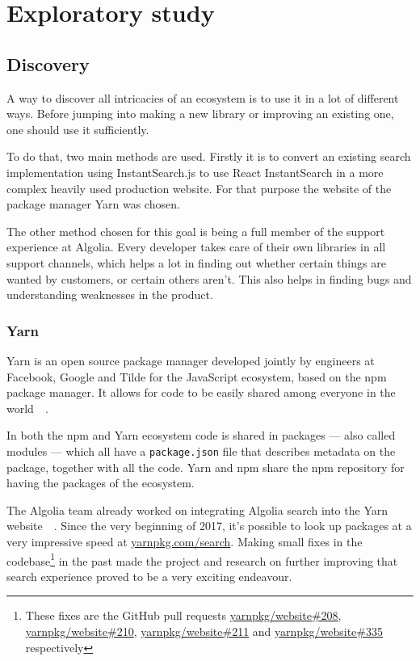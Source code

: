 
\chapter{Exploratory study} %
\label{chp:exploratory_study}

\section{Discovery}
\label{sec:discovery}

A way to discover all intricacies of an ecosystem is to use it in a lot of different ways. Before jumping into making a new library or improving an existing one, one should use it sufficiently.

To do that, two main methods are used. Firstly it is to convert an existing search implementation using InstantSearch.js\cite{instantsearch-js} to use React InstantSearch in a more complex heavily used production website. For that purpose the website of the package manager Yarn\cite{yarn-site} was chosen.

The other method chosen for this goal is being a full member of the support experience at Algolia. Every developer takes care of their own libraries in all support channels, which helps a lot in finding out whether certain things are wanted by customers, or certain others aren't. This also helps in finding bugs and understanding weaknesses in the product.

\subsection{Yarn} %
\label{ssec:yarn}

Yarn is an open source package manager developed jointly by engineers at Facebook, Google and Tilde for the JavaScript ecosystem, based on the npm package manager. It allows for code to be easily shared among everyone in the world~\cite{yarn-site}~.

In both the npm and Yarn ecosystem code is shared in packages --- also called modules --- which all have a {\tt package.json} file that describes metadata on the package, together with all the code. Yarn and npm share the npm repository for having the packages of the ecosystem.

The Algolia team already worked on integrating Algolia search into the Yarn website~\cite{yarn-pr-add-algolia}~. Since the very beginning of 2017, it’s possible to look up packages at a very impressive speed at \href{https://yarnpkg.com/search}{yarnpkg.com/search}. Making small fixes in the codebase\footnote{These fixes are the GitHub pull requests \href{https://github.com/yarnpkg/website/pulls/208}{yarnpkg/website\#208}, \href{https://github.com/yarnpkg/website/pulls/210}{yarnpkg/website\#210}, \href{https://github.com/yarnpkg/website/pulls211}{yarnpkg/website\#211} and \href{https://github.com/yarnpkg/website/pulls/335}{yarnpkg/website\#335} respectively} in the past made the project and research on further improving that search experience proved to be a very exciting endeavour.

